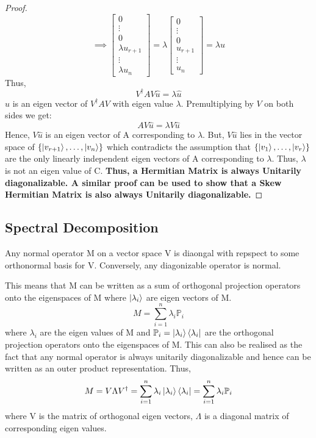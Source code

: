 \begin{proof}
    \[ \implies \begin{bmatrix} 0 \\ \vdots \\ 0 \\ \lambda u_{r+1} \\ \vdots \\ \lambda u_n \end{bmatrix}=\lambda \begin{bmatrix} 0 \\ \vdots \\ 0 \\ u_{r+1} \\ \vdots \\ u_n \end{bmatrix} = \lambda \hat{u} \]
    Thus, 
    \[V^{\dagger}AV\hat{u}=\lambda \hat{u}\] 
    $\hat{u}$ is an eigen vector of $V^{\dagger}AV$ with eigen value $\lambda$.
    Premultiplying by $V$ on both sides we get:
    \[AV\hat{u}=\lambda V\hat{u}\]
    Hence, $V\hat{u}$ is an eigen vector of A corresponding to $\lambda$. But, 
    $V\hat{u}$ lies in the vector space of $\{\ket{v_{r+1}}, \ldots, \ket{v_n}\}$ which contradicts the assumption that 
    $\{\ket{v_1},\ldots,\ket{v_r}\}$ are the only linearly independent eigen vectors of A corresponding to $\lambda$. Thus, $\lambda$ is not an eigen value of C.
    \textbf{Thus, a Hermitian Matrix is always Unitarily diagonalizable. A similar proof can be used to show that a Skew Hermitian Matrix is also always Unitarily diagonalizable.}  
\end{proof}

\subsection{Spectral Decomposition}
\begin{theorem} 
    Any normal operator M on a vector space V is diaongal with repspect to some orthonormal basis for V. 
    Conversely, any diagonizable operator is normal.
\end{theorem}
This means that M can be written as a sum of orthogonal projection operators onto the eigenspaces of M where $\ket{\lambda_i}$ are 
eigen vectors of M.
\[ M=\sum_{i=1}^n \lambda_i \mathbb{P}_i \]
where $\lambda_i$ are the eigen values of M and 
$\mathbb{P}_i = \ket{\lambda_i}\bra{\lambda_i}$ are the orthogonal projection operators onto the eigenspaces of M. 
This can also be realised as the fact that any normal operator is always unitarily diagonalizable and hence can be written as
an outer product representation. Thus, 
\[M = V\Lambda V^{\dagger} = \sum_{i=1}^n \lambda_i \ket{\lambda_i}\bra{\lambda_i} = \sum_{i=1}^n \lambda_i \mathbb{P}_i \]
where V is the matrix of orthogonal eigen vectors, $\Lambda$ is a diagonal matrix of corresponding eigen values.

